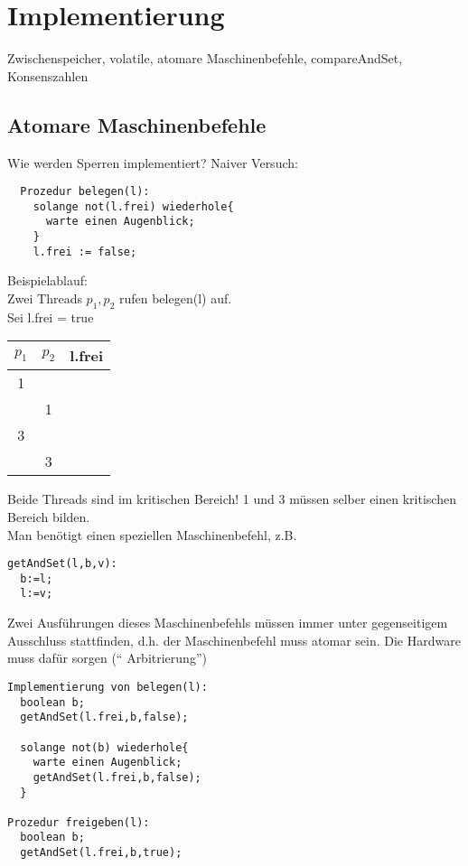 \documentclass[a4paper,12pt]{scrartcl}
\begin{document}
\section{Implementierung}
Zwischenspeicher, volatile, atomare Maschinenbefehle, compareAndSet, Konsenszahlen

\subsection{Atomare Maschinenbefehle}

Wie werden Sperren implementiert? Naiver Versuch:
\begin{lstlisting}
  Prozedur belegen(l):
    solange not(l.frei) wiederhole{
      warte einen Augenblick;
    }
    l.frei := false;
\end{lstlisting}

Beispielablauf:\\
Zwei Threads $p_1,p_2$ rufen belegen(l) auf.\\
Sei l.frei = true\\
\begin{tabular}{c c|c}
  $p_1$ & $p_2$ & l.frei\\
\hline
 1 & & \\
 & 1 & \\
 3 & & \\
 & 3 & \\
 
\end{tabular}

Beide Threads sind im kritischen Bereich! 1 und 3 müssen selber einen kritischen Bereich bilden.\\
Man benötigt einen speziellen Maschinenbefehl, z.B.
\begin{lstlisting}
getAndSet(l,b,v):
  b:=l;
  l:=v;
\end{lstlisting}

Zwei Ausführungen dieses Maschinenbefehls müssen immer unter gegenseitigem Ausschluss stattfinden, d.h. der Maschinenbefehl muss atomar sein. Die Hardware muss dafür sorgen ("` Arbitrierung"')\\

\begin{lstlisting}
Implementierung von belegen(l):
  boolean b;
  getAndSet(l.frei,b,false);
 
  solange not(b) wiederhole{
    warte einen Augenblick;
    getAndSet(l.frei,b,false);
  }
  
Prozedur freigeben(l):
  boolean b;
  getAndSet(l.frei,b,true);
  
\end{lstlisting}
\end{document}
